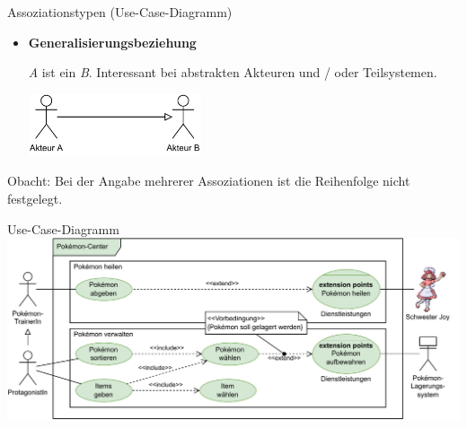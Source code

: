 \begin{diag}{Assoziationstypen (Use-Case-Diagramm)}
\begin{itemize}
        \item \textbf{Generalisierungsbeziehung}

              \emph{A} ist ein \emph{B}.
              Interessant bei abstrakten Akteuren und / oder Teilsystemen.

              \vspace{1em}
              \begin{center}
                  \includegraphics[width=0.4\textwidth]{includes/figures/defi_diagrams_use_case_generalisierung.pdf}
              \end{center}
    \end{itemize}

    Obacht: Bei der Angabe mehrerer Assoziationen ist die Reihenfolge nicht festgelegt.
\end{diag}

\begin{example}{Use-Case-Diagramm}
    \includegraphics[width=\textwidth]{includes/figures/example_diagrams_use_case.pdf}
\end{example}

